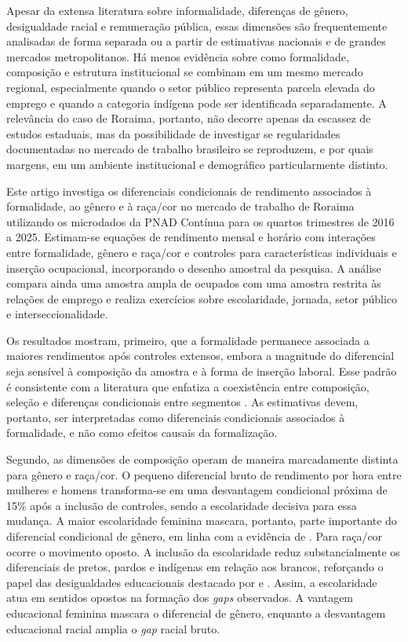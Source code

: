 \documentclass[12pt]{article}
\begin{document}
Apesar da extensa literatura sobre informalidade, diferenças de gênero, desigualdade 
racial e remuneração pública, essas dimensões são frequentemente analisadas de forma 
separada ou a partir de estimativas nacionais e de grandes mercados metropolitanos. Há 
menos evidência sobre como formalidade, composição e estrutura institucional se combinam 
em um mesmo mercado regional, especialmente quando o setor público representa parcela 
elevada do emprego e quando a categoria indígena pode ser identificada separadamente. 
A relevância do caso de Roraima, portanto, não decorre apenas da escassez de estudos 
estaduais, mas da possibilidade de investigar se regularidades documentadas no mercado 
de trabalho brasileiro se reproduzem, e por quais margens, em um ambiente institucional 
e demográfico particularmente distinto.

Este artigo investiga os diferenciais condicionais de rendimento associados à formalidade, 
ao gênero e à raça/cor no mercado de trabalho de Roraima utilizando os microdados da PNAD 
Contínua para os quartos trimestres de 2016 a 2025. Estimam-se equações de rendimento 
mensal e horário com interações entre formalidade, gênero e raça/cor e controles para 
características individuais e inserção ocupacional, incorporando o desenho amostral da 
pesquisa. A análise compara ainda uma amostra ampla de ocupados com uma amostra restrita 
às relações de emprego e realiza exercícios sobre escolaridade, jornada, setor público e 
interseccionalidade.

Os resultados mostram, primeiro, que a formalidade permanece associada a maiores rendimentos 
após controles extensos, embora a magnitude do diferencial seja sensível à composição da 
amostra e à forma de inserção laboral. Esse padrão é consistente com a literatura que 
enfatiza a coexistência entre composição, seleção e diferenças condicionais entre 
segmentos \citep{curi2006, meghir2015, ulyssea2018}. As estimativas devem, portanto, 
ser interpretadas como diferenciais condicionais associados à formalidade, e não como 
efeitos causais da formalização.

Segundo, as dimensões de composição operam de maneira marcadamente distinta para gênero e 
raça/cor. O pequeno diferencial bruto de rendimento por hora entre mulheres e homens 
transforma-se em uma desvantagem condicional próxima de 15\% após a inclusão de controles, 
sendo a escolaridade decisiva para essa mudança. A maior escolaridade feminina mascara, 
portanto, parte importante do diferencial condicional de gênero, em linha com a evidência 
de \citet{giuberti2005}. Para raça/cor ocorre o movimento oposto. A inclusão da escolaridade 
reduz substancialmente os diferenciais de pretos, pardos e indígenas em relação aos brancos, 
reforçando o papel das desigualdades educacionais destacado por \citet{soares2000} e
 \citet{campante2004}. Assim, a escolaridade atua em sentidos opostos na formação dos 
 \textit{gaps} observados. A vantagem educacional feminina mascara o diferencial de gênero, enquanto 
 a desvantagem educacional racial amplia o \textit{gap} racial bruto.
\end{document}
